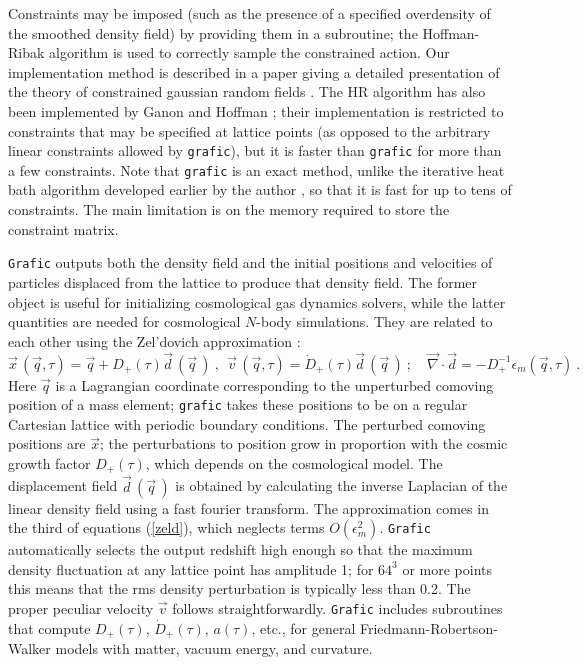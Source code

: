 Constraints may be imposed (such as the presence of a specified overdensity
of the smoothed density field) by providing them in a subroutine;
the Hoffman-Ribak algorithm \cite{hr} is used to correctly sample the
constrained action.  Our implementation method is described in a paper
giving a detailed presentation of the theory of constrained gaussian random
fields \cite{vdw}.  The HR algorithm has also been implemented by Ganon
and Hoffman \cite{gh}; their implementation is restricted to constraints
that may be specified at lattice points (as opposed to the arbitrary linear
constraints allowed by {\tt grafic}), but it is faster than {\tt grafic}
for more than a few constraints.  Note that {\tt grafic} is an exact
method, unlike the iterative heat bath algorithm developed earlier by
the author \cite{b87}, so that it is fast for up to tens of constraints.
The main limitation is on the memory required to store the constraint matrix.

{\tt Grafic} outputs both the density field and the initial positions and
velocities of particles displaced from the lattice to produce that density
field.  The former object is useful for initializing cosmological gas
dynamics solvers, while the latter quantities are needed for cosmological
$N$-body simulations.  They are related to each other using the Zel'dovich
approximation \cite{zel70}:
\begin{equation}
\label{zeld}
  \vec x\,(\vec q,\tau)=\vec q+D_+(\tau)\vec d\,(\vec q\,)\ ,\ \ 
  \vec v\,(\vec q,\tau)=\dot D_+(\tau)\vec d\,(\vec q\,)\ ;\quad
  \vec\nabla\cdot\vec d=-D_+^{-1}\epsilon_m(\vec q,\tau)\ .
\end{equation}
Here $\vec q$ is a Lagrangian coordinate corresponding to the unperturbed
comoving position of a mass element; {\tt grafic} takes these positions
to be on a regular Cartesian lattice with periodic boundary conditions.
The perturbed comoving positions are $\vec x$; the perturbations to position
grow in proportion with the cosmic growth factor $D_+(\tau)$, which depends
on the cosmological model.  The displacement field $\vec d\,(\vec q\,)$
is obtained by calculating the inverse Laplacian of the linear density field
using a fast fourier transform.  The approximation comes in the third of
equations (\ref{zeld}), which neglects terms $O(\epsilon_m^2)$.  {\tt Grafic}
automatically selects the output redshift high enough so that the maximum
density fluctuation at any lattice point has amplitude 1; for $64^3$ or
more  points this means that the rms density perturbation is typically less
than 0.2.  The proper peculiar velocity $\vec v$ follows straightforwardly.
{\tt Grafic} includes subroutines that compute $D_+(\tau)$, $\dot D_+(\tau)$,
$a(\tau)$, etc., for general Friedmann-Robertson-Walker models with matter,
vacuum energy, and curvature.

